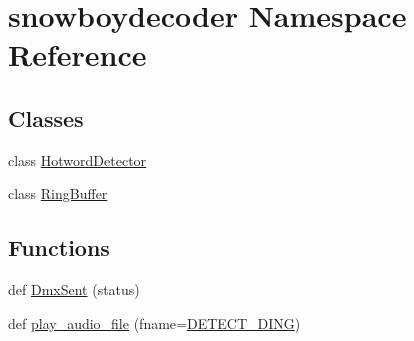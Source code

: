\hypertarget{namespacesnowboydecoder}{}\section{snowboydecoder Namespace Reference}
\label{namespacesnowboydecoder}
\subsection*{Classes}
\begin{DoxyCompactItemize}
\item 
class \hyperlink{classsnowboydecoder_1_1HotwordDetector}{Hotword\+Detector}
\item 
class \hyperlink{classsnowboydecoder_1_1RingBuffer}{Ring\+Buffer}
\end{DoxyCompactItemize}
\subsection*{Functions}
\begin{DoxyCompactItemize}
\item 
def \hyperlink{namespacesnowboydecoder_a49acad53623a8d74609d66ebb5197165}{Dmx\+Sent} (status)
\item 
def \hyperlink{namespacesnowboydecoder_ad1759aa8135729988614c8c6709c95fe}{play\+\_\+audio\+\_\+file} (fname=\hyperlink{namespacesnowboydecoder_ae78f17cd44cb19906efdf4e4b57f1553}{D\+E\+T\+E\+C\+T\+\_\+\+D\+I\+NG})
\end{DoxyCompactItemize}
